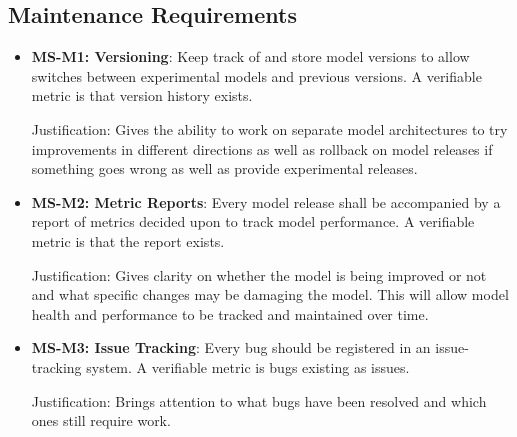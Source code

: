 \documentclass[12pt]{article}
\begin{document}
\subsection{Maintenance Requirements}
\begin{itemize}
    \item \textbf{MS-M1: Versioning}: Keep track of and store model versions to allow
     switches between experimental models and previous versions. A verifiable metric is 
     that version history exists.

    Justification: Gives the ability to work on separate model architectures to try 
    improvements in different directions as well as rollback on model releases 
    if something goes wrong as well as provide experimental releases.
    
    \item \textbf{MS-M2: Metric Reports}: Every model release shall be accompanied by 
    a report of metrics decided upon to track model performance. A verifiable metric is 
    that the report exists.

    Justification: Gives clarity on whether the model is being improved or not and what
     specific changes may be damaging the model. This will allow model health and 
     performance to be tracked and maintained over time.

    \item \textbf{MS-M3: Issue Tracking}: Every bug should be registered in an issue-tracking system. A verifiable metric is bugs existing as issues. 

    Justification: Brings attention to what bugs have been resolved and which 
    ones still require work.
    
\end{itemize}
\end{document}
